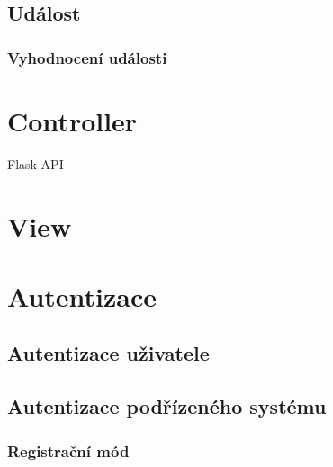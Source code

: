 \subsection{Událost}

\subsubsection{Vyhodnocení události}

\section{Controller}

Flask API

\section{View}

\section{Autentizace}

\subsection{Autentizace uživatele}

\subsection{Autentizace podřízeného systému}

\subsubsection{Registrační mód}

